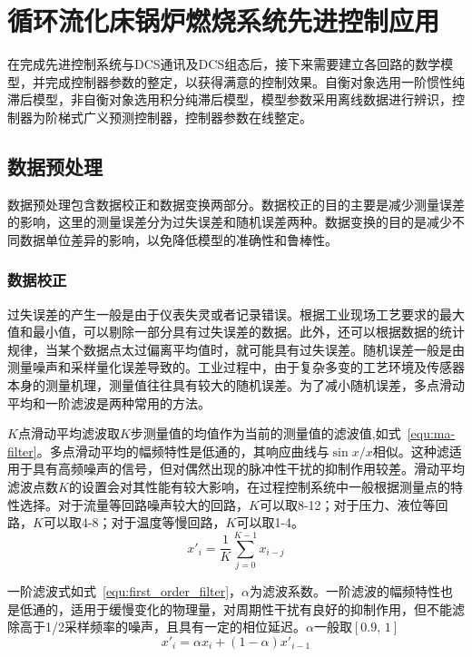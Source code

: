 \chapter{循环流化床锅炉燃烧系统先进控制应用}
\label{chap:application}
在完成先进控制系统与DCS通讯及DCS组态后，接下来需要建立各回路的数学模型，并完成控制器参数的整定，以获得满意的控制效果。自衡对象选用一阶惯性纯滞后模型，非自衡对象选用积分纯滞后模型，模型参数采用离线数据进行辨识，控制器为阶梯式广义预测控制器，控制器参数在线整定。

\section{数据预处理}
\label{sec:pre_cal}
数据预处理包含数据校正和数据变换两部分。数据校正的目的主要是减少测量误差的影响，这里的测量误差分为过失误差和随机误差两种。数据变换的目的是减少不同数据单位差异的影响，以免降低模型的准确性和鲁棒性。

\subsection{数据校正}
过失误差的产生一般是由于仪表失灵或者记录错误。根据工业现场工艺要求的最大值和最小值，可以剔除一部分具有过失误差的数据。此外，还可以根据数据的统计规律，当某个数据点太过偏离平均值时，就可能具有过失误差。随机误差一般是由测量噪声和采样量化误差导致的。工业过程中，由于复杂多变的工艺环境及传感器本身的测量机理，测量值往往具有较大的随机误差。为了减小随机误差，多点滑动平均和一阶滤波是两种常用的方法。

$K$点滑动平均滤波取$K$步测量值的均值作为当前的测量值的滤波值,如式~\ref{equ:ma-filter}。多点滑动平均的幅频特性是低通的，其响应曲线与$\sin{x}/x$相似。这种滤适用于具有高频噪声的信号，但对偶然出现的脉冲性干扰的抑制作用较差。滑动平均滤波点数$K$的设置会对其性能有较大影响，在过程控制系统中一般根据测量点的特性选择。对于流量等回路噪声较大的回路，$K$可以取8-12；对于压力、液位等回路，$K$可以取4-8；对于温度等慢回路，$K$可以取1-4。
\begin{equation}
\label{equ:ma-filter}
{x'}_{i}=\frac{1}{K}\sum_{j=0}^{K-1}{x_{i-j}}
\end{equation}


一阶滤波式如式~\ref{equ:first_order_filter}，$\alpha$为滤波系数。一阶滤波的幅频特性也是低通的，适用于缓慢变化的物理量，对周期性干扰有良好的抑制作用，但不能滤除高于1/2采样频率的噪声，且具有一定的相位延迟。$\alpha$一般取$[0.9,\,1]$
\begin{equation}
\label{equ:first_order_filter}
{{x}'_{i}}=\alpha {x_{i}} + (1-\alpha){{x'}_{i-1}}
\end{equation}

